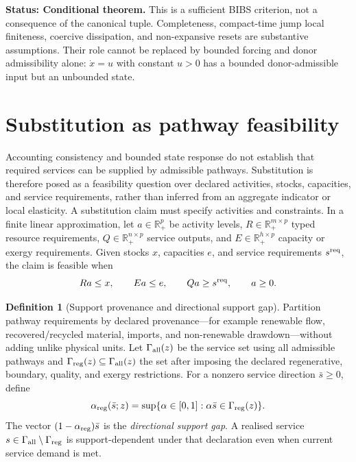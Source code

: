 \documentclass[11pt]{article}
\theoremstyle{definition}
\newtheorem{definition}{Definition}
\newcommand{\Rp}{\mathbb R_+}
\newcommand{\status}[1]{\par\smallskip\noindent\textbf{Status: #1.}\quad}
\begin{document}
\status{Conditional theorem} This is a sufficient BIBS criterion, not a consequence of the canonical tuple. Completeness, compact-time jump local finiteness, coercive dissipation, and non-expansive resets are substantive assumptions. Their role cannot be replaced by bounded forcing and donor admissibility alone: $\dot x=u$ with constant $u>0$ has a bounded donor-admissible input but an unbounded state.

\section{Substitution as pathway feasibility}

Accounting consistency and bounded state response do not establish that required services can be supplied by admissible pathways. Substitution is therefore posed as a feasibility question over declared activities, stocks, capacities, and service requirements, rather than inferred from an aggregate indicator or local elasticity. A substitution claim must specify activities and constraints. In a finite linear approximation, let $a\in\Rp^p$ be activity levels, $R\in\Rp^{m\times p}$ typed resource requirements, $Q\in\Rp^{n\times p}$ service outputs, and $E\in\Rp^{h\times p}$ capacity or exergy requirements. Given stocks $x$, capacities $e$, and service requirements $s^{\rm req}$, the claim is feasible when
\begin{equation}
Ra\le x,\qquad Ea\le e,\qquad Qa\ge s^{\rm req},
\qquad a\ge0.
\label{eq:linear-substitution}
\end{equation}

\begin{definition}[Support provenance and directional support gap]
Partition pathway requirements by declared provenance---for example renewable flow, recovered/recycled material, imports, and non-renewable drawdown---without adding unlike physical units. Let $\Gamma_{\rm all}(z)$ be the service set using all admissible pathways and $\Gamma_{\rm reg}(z)\subseteq\Gamma_{\rm all}(z)$ the set after imposing the declared regenerative, boundary, quality, and exergy restrictions. For a nonzero service direction $\bar s\ge0$, define
\[
\alpha_{\rm reg}(\bar s;z)
=\sup\{\alpha\in[0,1]:\alpha\bar s\in\Gamma_{\rm reg}(z)\}.
\]
The vector $(1-\alpha_{\rm reg})\bar s$ is the \emph{directional support gap}. A realised service $s\in\Gamma_{\rm all}\setminus\Gamma_{\rm reg}$ is support-dependent under that declaration even when current service demand is met.
\end{definition}
\end{document}
